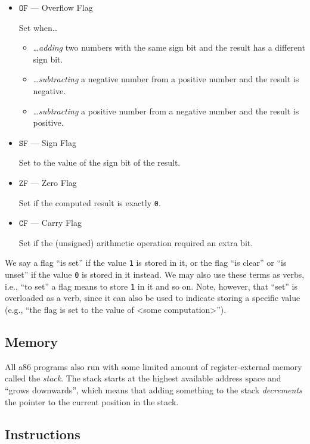 \documentclass{article}
\newcommand{\lang}{a86}
\newcommand{\term}[1]{\ensuremath{\mathtt{#1}}}
\begin{document}
{\renewcommand\labelitemii{}
  \begin{itemize}
  \item \term{OF} --- Overflow Flag

    Set when\ldots
    \begin{itemize}
    \item \ldots\emph{adding} two numbers with the same sign bit and the result
      has a different sign bit.
    \item \ldots\emph{subtracting} a negative number from a positive number and
      the result is negative.
    \item \ldots\emph{subtracting} a positive number from a negative number and
      the result is positive.
    \end{itemize}
  \item \term{SF} --- Sign Flag

    Set to the value of the sign bit of the result.
  \item \term{ZF} --- Zero Flag

    Set if the computed result is exactly \texttt{0}.
  \item \term{CF} --- Carry Flag

    Set if the (unsigned) arithmetic operation required an extra bit.
  \end{itemize}

}

\noindent We say a flag ``is set'' if the value \texttt{1} is stored in it, or
the flag ``is clear'' or ``is unset'' if the value \texttt{0} is stored in it
instead. We may also use these terms as verbs, i.e., ``to set'' a flag means to
store \texttt{1} in it and so on. Note, however, that ``set'' is overloaded as a
verb, since it can also be used to indicate storing a specific value (e.g.,
``the flag is set to the value of <some computation>'').

\subsection{Memory}

All \lang{} programs also run with some limited amount of register-external
memory called the \emph{stack}. The stack starts at the highest available
address space and ``grows downwards'', which means that adding something to the
stack \emph{decrements} the pointer to the current position in the stack.

\subsection{Instructions}
\end{document}
